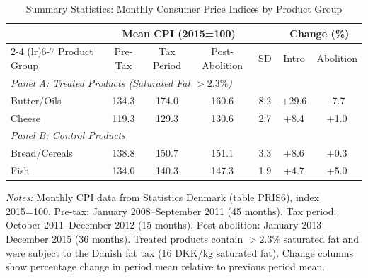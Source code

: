 \begin{table}[H]
\centering
\caption{Summary Statistics: Monthly Consumer Price Indices by Product Group}
\label{tab:summary}
\begin{threeparttable}
\begin{tabular}{lcccccc}
\toprule
 & \multicolumn{3}{c}{Mean CPI (2015=100)} & & \multicolumn{2}{c}{Change (\%)} \\
\cmidrule(lr){2-4} \cmidrule(lr){6-7}
Product Group & Pre-Tax & Tax Period & Post-Abolition & SD & Intro & Abolition \\
\midrule
\multicolumn{7}{l}{\textit{Panel A: Treated Products (Saturated Fat $> 2.3\%$)}} \\
Butter/Oils & 134.3 & 174.0 & 160.6 & 8.2 & +29.6 & -7.7 \\
Cheese & 119.3 & 129.3 & 130.6 & 2.7 & +8.4 & +1.0 \\
\midrule
\multicolumn{7}{l}{\textit{Panel B: Control Products}} \\
Bread/Cereals & 138.8 & 150.7 & 151.1 & 3.3 & +8.6 & +0.3 \\
Fish & 134.0 & 140.3 & 147.3 & 1.9 & +4.7 & +5.0 \\
\bottomrule
\end{tabular}
\begin{tablenotes}[flushleft]
\small
\item \textit{Notes:} Monthly CPI data from Statistics Denmark (table PRIS6), index 2015=100. Pre-tax: January 2008--September 2011 (45 months). Tax period: October 2011--December 2012 (15 months). Post-abolition: January 2013--December 2015 (36 months). Treated products contain $>2.3\%$ saturated fat and were subject to the Danish fat tax (16 DKK/kg saturated fat). Change columns show percentage change in period mean relative to previous period mean.
\end{tablenotes}
\end{threeparttable}
\end{table}

